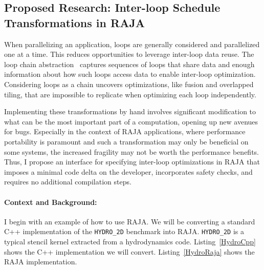 \documentclass{article}
\begin{document}
\subsection{Proposed Research: Inter-loop Schedule Transformations in RAJA}
\label{Sec:Work1}
When parallelizing an application, loops are generally considered and
parallelized one at a time.
This reduces opportunities to leverage inter-loop data reuse.
The loop chain abstraction~\cite{krieger2013loop} captures sequences of loops that share 
data and enough information about how such loops access 
data to enable inter-loop optimization.
Considering loops as a chain uncovers optimizations, like fusion
and overlapped tiling, that are impossible to replicate when optimizing
each loop independently.

Implementing these transformations by hand involves significant modification to what can be the most important part of a computation, opening up new avenues for bugs. 
Especially in the context of RAJA applications, where performance portability is paramount and such a transformation may only be beneficial on some systems, the increased fragility may not be worth the performance benefits. 
Thus, I propose an interface for specifying inter-loop optimizations in RAJA that imposes a minimal code delta on the developer, incorporates safety checks, and requires no additional compilation steps. 

\paragraph{Context and Background:}

I begin with an example of how to use RAJA. We will be converting a standard C++ implementation of the \verb.HYDRO_2D. benchmark into RAJA. 
\verb.HYDRO_2D. is a typical stencil kernel extracted from a hydrodynamics code. 
Listing~\ref{HydroCpp} shows the C++ implementation we will convert.
Listing~\ref{HydroRaja} shows the RAJA implementation.
\end{document}
